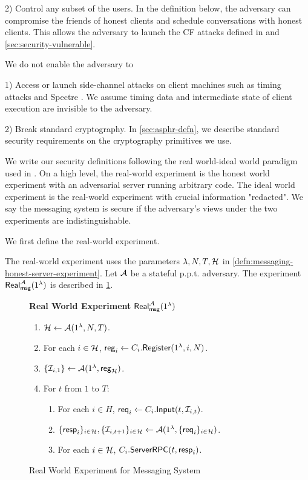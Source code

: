 2) Control any subset of the users. In the definition below, the adversary can compromise the friends of honest clients and schedule conversations with honest clients. This allows the adversary to launch the CF attacks defined in \cite{angel2018cf} and \cref{sec:security-vulnerable}.

We do not enable the adversary to

1) Access or launch side-channel attacks on client machines such as timing attacks and Spectre \cite{Spectre}. We assume timing data and intermediate state of client execution are invisible to the adversary.

2) Break standard cryptography. In \cref{sec:asphr-defn}, we describe standard security requirements on the cryptography primitives we use.

We write our security definitions following the real world-ideal world paradigm used in \cite[Section 2.2]{shi2021non}. On a high level, the real-world experiment is the honest world experiment with an adversarial server running arbitrary code. The ideal world experiment is the real-world experiment with crucial information "redacted". We say the messaging system is secure if the adversary's views under the two experiments are indistinguishable.

We first define the real-world experiment.

\begin{definition}
\label{defn:messaging-real-world-experiment}
The real-world experiment uses the parameters $\lambda, N, T, \mathcal{H}$ in \cref{defn:messaging-honest-server-experiment}. Let $\mathcal{A}$ be a stateful p.p.t. adversary. The experiment $\mathsf{Real}_{\mathsf{msg}}^{\mathcal{A}}(1^{\lambda})$ is described in \cref{expr:messaging-real-world}.
\end{definition}

\begin{figure}[!ht]
\begin{framed}
\textbf{Real World Experiment }$\mathsf{Real}_{\mathsf{msg}}^{\mathcal{A}}(1^{\lambda})$
\begin{enumerate}
\item $\mathcal{H} \leftarrow \mathcal{A}(1^{\lambda}, N, T)$.
\item For each $i \in \mathcal{H}$, $\mathsf{reg}_i \leftarrow C_i.\mathsf{Register}(1^{\lambda}, i, N)$. 
\item $\{\mathcal{I}_{i, 1}\} \leftarrow \mathcal{A}(1^{\lambda}, \mathsf{reg}_{\mathcal{H}})$.
\item For $t$ from $1$ to $T$:
    \begin{enumerate}
    \item For each $i \in H$, $\mathsf{req}_i \leftarrow C_i.\mathsf{Input}(t, \mathcal{I}_{i, t})$.
    
    \item $\{\mathsf{resp}_i\}_{i \in \mathcal{H}}, \{\mathcal{I}_{i, t + 1}\}_{i \in \mathcal{H}} \leftarrow \mathcal{A}(1^{\lambda}, \{\mathsf{req}_i\}_{i \in \mathcal{H}})$.
    
    \item For each $i \in \mathcal{H}$, $C_i.\mathsf{ServerRPC}(t, \mathsf{resp}_i)$.
    \end{enumerate}
\end{enumerate}
\end{framed}
\caption{Real World Experiment for Messaging System}
\label{expr:messaging-real-world}
\end{figure}

